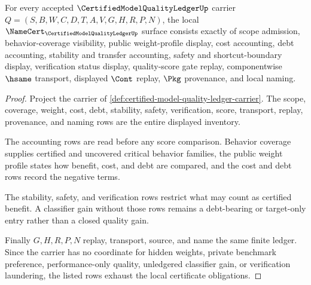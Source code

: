 \begin{theorem}
\label{thm:certified-model-quality-ledger-namecert-obligations}
For every accepted $\CertifiedModelQualityLedgerUp$ carrier $Q=(S,B,W,C,D,T,A,V,G,H,R,P,N)$, the local $\NameCert_{\CertifiedModelQualityLedgerUp}$ surface consists exactly of scope admission, behavior-coverage visibility, public weight-profile display, cost accounting, debt accounting, stability and transfer accounting, safety and shortcut-boundary display, verification status display, quality-score gate replay, componentwise $\hsame$ transport, displayed $\Cont$ replay, $\Pkg$ provenance, and local naming.
\end{theorem}
\begin{proof}
Project the carrier of \autoref{def:certified-model-quality-ledger-carrier}. The scope, coverage, weight, cost, debt, stability, safety, verification, score, transport, replay, provenance, and naming rows are the entire displayed inventory.

The accounting rows are read before any score comparison. Behavior coverage supplies certified and uncovered critical behavior families, the public weight profile states how benefit, cost, and debt are compared, and the cost and debt rows record the negative terms.

The stability, safety, and verification rows restrict what may count as certified benefit. A classifier gain without those rows remains a debt-bearing or target-only entry rather than a closed quality gain.

Finally $G,H,R,P,N$ replay, transport, source, and name the same finite ledger. Since the carrier has no coordinate for hidden weights, private benchmark preference, performance-only quality, unledgered classifier gain, or verification laundering, the listed rows exhaust the local certificate obligations.
\end{proof}

